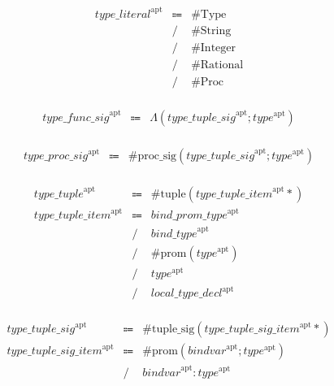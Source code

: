 \begin{align*}
    \begin{array}{rcll}
        \mathit{type\_literal}^\mathrm{apt}
        &\Coloneq &\mathrm{\#Type} \\
        &\mathrel{/} &\mathrm{\#String} \\
        &\mathrel{/} &\mathrm{\#Integer} \\
        &\mathrel{/} &\mathrm{\#Rational} \\
        &\mathrel{/} &\mathrm{\#Proc}
    \end{array}
\end{align*}

\begin{align*}
    \begin{array}{rcll}
        \mathit{type\_func\_sig}^\mathrm{apt}
        &\Coloneq &\Lambda(\mathit{type\_tuple\_sig}^\mathrm{apt}; \mathit{type}^\mathrm{apt})
    \end{array}
\end{align*}

\begin{align*}
    \begin{array}{rcll}
        \mathit{type\_proc\_sig}^\mathrm{apt}
        &\Coloneq &\mathrm{\#proc\_sig}(\mathit{type\_tuple\_sig}^\mathrm{apt}; \mathit{type}^\mathrm{apt})
    \end{array}
\end{align*}

\begin{align*}
    \begin{array}{rcll}
        \mathit{type\_tuple}^\mathrm{apt}
        &\Coloneq &\mathrm{\#tuple}(\mathit{type\_tuple\_item}^\mathrm{apt}{*}) \\
        \mathit{type\_tuple\_item}^\mathrm{apt}
        &\Coloneq &\mathit{bind\_prom\_type}^\mathrm{apt} \\
        &\mathrel{/} &\mathit{bind\_type}^\mathrm{apt} \\
        &\mathrel{/} &\mathrm{\#prom}(\mathit{type}^\mathrm{apt}) \\
        &\mathrel{/} &\mathit{type}^\mathrm{apt} \\
        &\mathrel{/} &\mathit{local\_type\_decl}^\mathrm{apt}
    \end{array}
\end{align*}

\begin{align*}
    \begin{array}{rcll}
        \mathit{type\_tuple\_sig}^\mathrm{apt}
        &\Coloneq &\mathrm{\#tuple\_sig}(\mathit{type\_tuple\_sig\_item}^\mathrm{apt}{*}) \\
        \mathit{type\_tuple\_sig\_item}^\mathrm{apt}
        &\Coloneq &\mathrm{\#prom}(\mathit{bindvar}^\mathrm{apt}; \mathit{type}^\mathrm{apt}) \\
        &\mathrel{/} &\mathit{bindvar}^\mathrm{apt}: \mathit{type}^\mathrm{apt}
    \end{array}
\end{align*}

